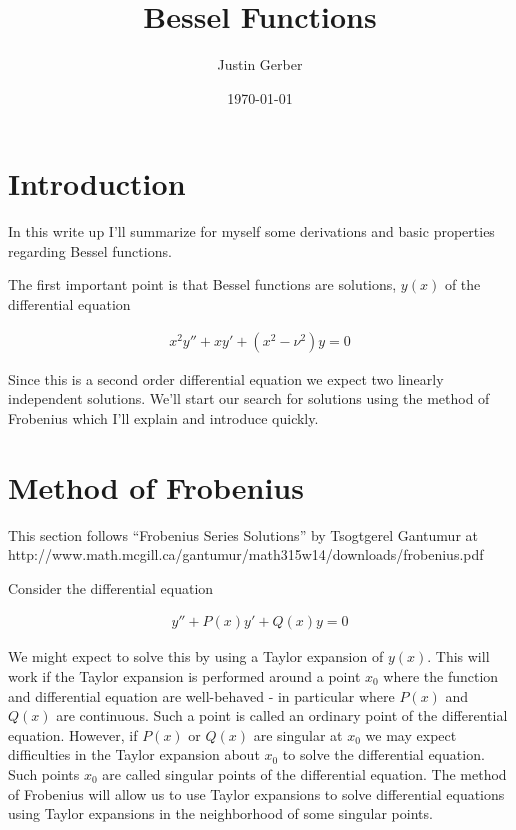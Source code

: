 \documentclass[12pt]{article}
\begin{document}
\title{Bessel Functions}
\author{Justin Gerber}
\date{\today}
\maketitle

\section{Introduction}

In this write up I'll summarize for myself some derivations and basic properties regarding Bessel functions.

The first important point is that Bessel functions are solutions, $y(x)$ of the differential equation

\begin{align}
x^2 y'' + x y' +(x^2-\nu^2)y = 0
\end{align}

Since this is a second order differential equation we expect two linearly independent solutions. We'll start our search for solutions using the method of Frobenius which I'll explain and introduce quickly.

\section{Method of Frobenius}

This section follows ``Frobenius Series Solutions'' by Tsogtgerel Gantumur at http://www.math.mcgill.ca/gantumur/math315w14/downloads/frobenius.pdf

Consider the differential equation

\begin{align}
y'' + P(x) y' + Q(x) y = 0
\end{align}

We might expect to solve this by using a Taylor expansion of $y(x)$. This will work if the Taylor expansion is performed around a point $x_0$ where the function and differential equation are well-behaved - in particular where $P(x)$ and $Q(x)$ are continuous. Such a point is called an ordinary point of the differential equation. However, if $P(x)$ or $Q(x)$ are singular at $x_0$ we may expect difficulties in the Taylor expansion about  $x_0$ to solve the differential equation. Such points $x_0$ are called singular points of the differential equation. The method of Frobenius will allow us to use Taylor expansions to solve differential equations using Taylor expansions in the neighborhood of some singular points.
\end{document}
